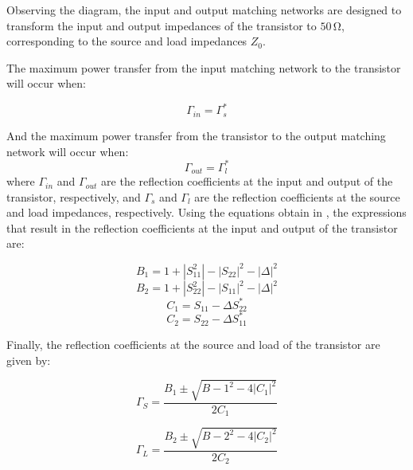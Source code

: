 Observing the diagram, the input and output matching networks are designed to transform the input and output impedances of the transistor to $50\,\si{\ohm}$, corresponding to the source and load impedances $Z_0$.

The maximum power transfer from the input matching network to the transistor will occur when:

\begin{equation}
    \Gamma_{in} = \Gamma_{s}^*
    \label{eq:GammaS=GammaL}
\end{equation}

And the maximum power transfer from the transistor to the output matching network will occur when:
\begin{equation}
    \Gamma_{out} = \Gamma_{l}^*
    \label{eq:GammaL=GammaS}
\end{equation}
where $\Gamma_{in}$ and $\Gamma_{out}$ are the reflection coefficients at the input and output of the transistor, respectively, and $\Gamma_{s}$ and $\Gamma_{l}$ are the reflection coefficients at the source and load impedances, respectively. Using the equations obtain in \cite{Pozar}, the expressions that result in the reflection coefficients at the input and output of the transistor are:

\begin{equation}
    B_1 = 1 + |S_{11}^2| - |S_{22}|^2 - |\Delta|^2 
    \label{eq:B1}
\end{equation}
\begin{equation}
    B_2 = 1 + |S_{22}^2| - |S_{11}|^2 - |\Delta|^2
    \label{eq:B2}
\end{equation}
\begin{equation}
    C_1 = S_{11} - \Delta S_{22}^*
    \label{eq:C1}
\end{equation}
\begin{equation}
    C_2 = S_{22} - \Delta S_{11}^* 
    \label{eq:C2}
\end{equation}

Finally, the reflection coefficients at the source and load of the transistor are given by:

\begin{equation}
    \Gamma_{S} = \frac{B_1 \pm \sqrt{B-1^2-4|C_1|^2}}{2C_1}
    \label{eq:GammaS}
\end{equation}

\begin{equation}
    \Gamma_{L} = \frac{B_2 \pm \sqrt{B-2^2-4|C_2|^2}}{2C_2}
    \label{eq:GammaL}
\end{equation}

